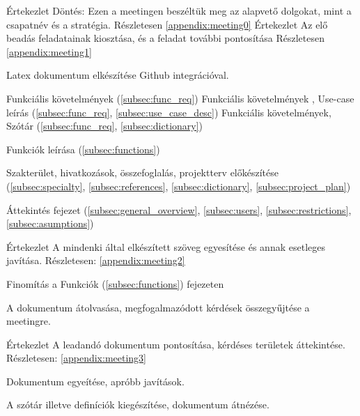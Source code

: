 \documentclass[../../projlab]{subfiles}
\begin{document}
\begin{naplo}
	{ Értekezlet
		\newline Döntés: Ezen a meetingen beszéltük meg az alapvető dolgokat, mint a csapatnév és a stratégia.
		Részletesen \ref{appendix:meeting0}
	}
	{ Értekezlet
		\newline Az elő beadás feladatainak kiosztása, és a feladat további pontosítása
		Részletesen \ref{appendix:meeting1}
	}

	{ 
		Latex dokumentum elkészítése Github integrációval.
	}

	{ 
		Funkciális követelmények (\ref{subsec:func_req})
	}
	{ 
		Funkciális követelmények , Use-case leírás (\ref{subsec:func_req}, \ref{subsec:use_case_desc})
	}
	{ 
		Funkciális követelmények, Szótár (\ref{subsec:func_req}, \ref{subsec:dictionary})
	}

	{ 
		Funkciók leírása (\ref{subsec:functions})
	}

	{ 
		Szakterület, hivatkozások, összefoglalás, projektterv előkészítése (\ref{subsec:specialty}, \ref{subsec:references}, \ref{subsec:dictionary}, \ref{subsec:project_plan})
	}

	{ 
		Áttekintés fejezet  (\ref{subsec:general_overview}, \ref{subsec:users}, \ref{subsec:restrictions}, \ref{subsec:asumptions})
	}

	{ 
		Értekezlet
		\newline A mindenki által elkészített szöveg egyesítése és annak esetleges javítása.
		\newline
		Részletesen: \ref{appendix:meeting2}
	}
	
	{ 
		Finomítás a Funkciók (\ref{subsec:functions}) fejezeten
	}
	
	{ 
		A dokumentum átolvasása, megfogalmazódott kérdések összegyűjtése a meetingre.
	}

	{ 
		Értekezlet \newline 
		A leadandó dokumentum pontosítása, kérdéses területek áttekintése.
		\newline
		Részletesen: \ref{appendix:meeting3}
	}

	{ 
		Dokumentum egyeítése, apróbb javítások.
	}
	
	{ 
		A szótár illetve definíciók kiegészítése, dokumentum átnézése. 
	}

	

\end{naplo}
\end{document}
